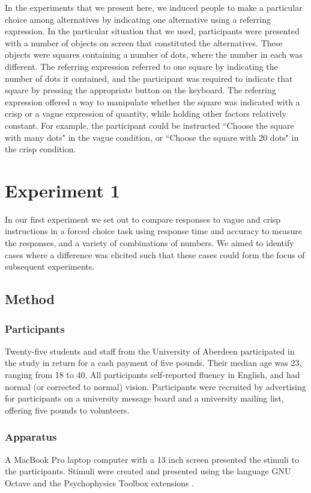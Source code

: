 \documentclass[man,floatmark]{apa}
\begin{document}
In the experiments that we present here, we induced people to make a particular choice among alternatives by indicating one alternative using a referring expression.  In the particular situation that we used, participants were presented with a number of objects on screen that constituted the alternatives.  These objects were squares containing a number of dots, where the number in each was different. The referring expression referred to one square by indicating the number of dots it contained, and the participant was required to indicate that square by pressing the appropriate button on the keyboard. The referring expression offered a way to manipulate whether the square was indicated with a crisp or a vague expression of quantity, while holding other factors relatively constant. For example, the participant could be instructed ``Choose the square with many dots" in the vague condition, or ``Choose the square with 20 dots" in the crisp condition.

\section{Experiment 1} 
In our first experiment we set out to compare responses to vague and crisp instructions in a forced choice task using response time and accuracy to measure the responses, and a variety of combinations of numbers. We aimed to identify cases where a difference was elicited such that these cases could form the focus of  subsequent experiments.

\subsection{Method}

\subsubsection{Participants}
Twenty-five students and staff from the University of Aberdeen participated in the study in return for a cash payment of five pounds. Their median age was 23, ranging from 18 to 40. All participants self-reported fluency in English, and had normal (or corrected to normal) vision. Participants were recruited by advertising for participants on a university message board and a university mailing list, offering five pounds to volunteers. 

\subsubsection{Apparatus}
A MacBook Pro laptop computer with a 13 inch screen presented the stimuli to the participants. Stimuli were created and presented using the language GNU Octave \cite{eaton:2002} and the Psychophysics Toolbox extensions \cite{ptbx1, ptbx2}.
\end{document}
